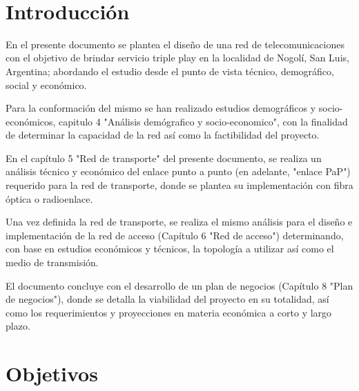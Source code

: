 \documentclass[12pt,a4paper]{book}
\begin{document}


$\ $

\tableofcontents %

\renewcommand{\tablename}{Tabla}
\renewcommand{\figurename}{Fig.}

\renewcommand{\appendixname}{Anexos}
\renewcommand{\appendixtocname}{Anexos}
\renewcommand{\appendixpagename}{Anexos}

\listoffigures %

\listoftables %


\chapter{Introducción}

En el presente documento se plantea el diseño de una red de telecomunicaciones con el objetivo de brindar servicio triple play en la localidad de Nogolí, San Luis, Argentina; abordando el estudio desde el punto de vista técnico, demográfico, social y económico. 

Para la conformación del mismo se han realizado estudios demográficos y socio-económicos, capitulo 4 "Análisis demógrafico y socio-economico", con la finalidad de determinar la capacidad de la red así como la factibilidad del proyecto.

En el capítulo 5 "Red de transporte" del presente documento, se realiza un análisis técnico y económico del enlace punto a punto (en adelante, "enlace PaP") requerido para la red de transporte, donde se plantea su implementación con fibra óptica o radioenlace. 

Una vez definida la red de transporte, se realiza el mismo análisis para el diseño e implementación de la red de acceso (Capítulo 6 "Red de acceso") determinando, con base en estudios económicos y técnicos, la topología a utilizar así como el medio de transmisión. 

El documento concluye con el desarrollo de un plan de negocios (Capítulo 8 "Plan de negocios"), donde se detalla la viabilidad del proyecto en su totalidad, así como los requerimientos y proyecciones en materia económica a corto y largo plazo.


\chapter{Objetivos}\label{objetivos}
\end{document}

